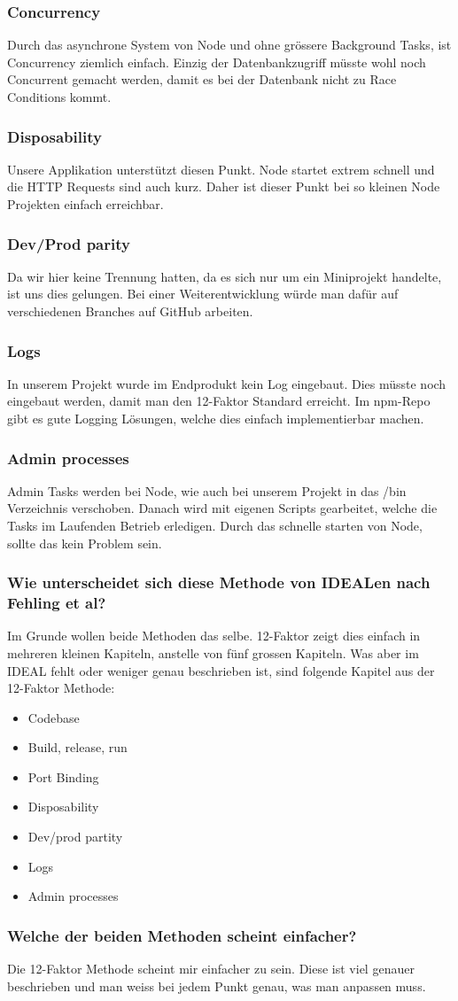 \subsubsection{Concurrency}
Durch das asynchrone System von Node und ohne grössere Background Tasks, ist Concurrency ziemlich einfach. Einzig der Datenbankzugriff müsste wohl noch Concurrent gemacht werden, damit es bei der Datenbank nicht zu Race Conditions kommt.
\subsubsection{Disposability}
Unsere Applikation unterstützt diesen Punkt. Node startet extrem schnell und die HTTP Requests sind auch kurz. Daher ist dieser Punkt bei so kleinen Node Projekten einfach erreichbar.
\subsubsection{Dev/Prod parity}
Da wir hier keine Trennung hatten, da es sich nur um ein Miniprojekt handelte, ist uns dies gelungen. Bei einer Weiterentwicklung würde man dafür auf verschiedenen Branches auf GitHub arbeiten.
\subsubsection{Logs}
In unserem Projekt wurde im Endprodukt kein Log eingebaut. Dies müsste noch eingebaut werden, damit man den 12-Faktor Standard erreicht. Im npm-Repo gibt es gute Logging Lösungen, welche dies einfach implementierbar machen.
\subsubsection{Admin processes}
Admin Tasks werden bei Node, wie auch bei unserem Projekt in das /bin Verzeichnis verschoben. Danach wird mit eigenen Scripts gearbeitet, welche die Tasks im Laufenden Betrieb erledigen. Durch das schnelle starten von Node, sollte das kein Problem sein.
\subsubsection{Wie unterscheidet sich diese Methode von IDEALen nach Fehling et al?}
Im Grunde wollen beide Methoden das selbe. 12-Faktor zeigt dies einfach in mehreren kleinen Kapiteln, anstelle von fünf grossen Kapiteln. 
Was aber im IDEAL fehlt oder weniger genau beschrieben ist, sind folgende Kapitel aus der 12-Faktor Methode:
\begin{itemize}
\item	Codebase
\item	Build, release, run
\item	Port Binding
\item	Disposability
\item	Dev/prod partity
\item	Logs
\item	Admin processes
\end{itemize}
\subsubsection{Welche der beiden Methoden scheint einfacher?}
Die 12-Faktor Methode scheint mir einfacher zu sein. Diese ist viel genauer beschrieben und man weiss bei jedem Punkt genau, was man anpassen muss.









